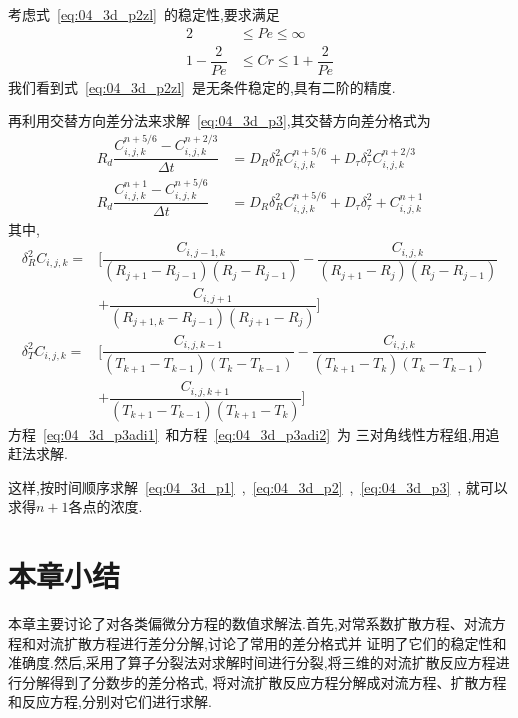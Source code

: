 考虑式~\eqref{eq:04_3d_p2zl}~的稳定性,要求满足
\begin{align}
2 & \leq Pe \leq \infty\\
1-\dfrac{2}{Pe}&\leq Cr\leq 1+\dfrac{2}{Pe}
\end{align}
我们看到式~\eqref{eq:04_3d_p2zl}~是无条件稳定的,具有二阶的精度.\par
再利用交替方向差分法来求解~\eqref{eq:04_3d_p3},其交替方向差分格式为
\begin{align}
R_d\dfrac{C_{i,j,k}^{n+5/6}-C_{i,j,k}^{n+2/3}}{\Delta t} &=
D_R\delta_R^2 C_{i,j,k}^{n+5/6}+D_{\tau}\delta^2_{\tau}C_{i,j,k}^{n+2/3} \label{eq:04_3d_p3adi1}\\
R_d\dfrac{C_{i,j,k}^{n+1}-C_{i,j,k}^{n+5/6}}{\Delta t}&=D_R\delta_R^2 C_{i,j,k}^{n+5/6}+D_{\tau}\delta_{\tau}^2+C_{i,j,k}^{n+1} \label{eq:04_3d_p3adi2} 
\end{align}
其中,
\begin{equation*}
\begin{split}
\delta_R^2 C_{i,j,k} =& [\dfrac{C_{i,j-1,k}}{(R_{j+1}-R_{j-1})(R_j-R_{j-1})}
-\dfrac{C_{i,j,k}}{(R_{j+1}-R_j)(R_j-R_{j-1})} \\
&+\dfrac{C_{i,j+1}}{(R_{j+1,k}-R_{j-1})(R_{j+1}-R_j)}] \\
\delta_T^2 C_{i,j,k} =& [\dfrac{C_{i,j,k-1}}{(T_{k+1}-T_{k-1})(T_k-T_{k-1})}-
\dfrac{C_{i,j,k}}{(T_{k+1}-T_k)(T_k-T_{k-1})} \\
&+\dfrac{C_{i,j,k+1}}{(T_{k+1}-T_{k-1})(T_{k+1}-T_k)}]
\end{split}
\end{equation*}
方程~\eqref{eq:04_3d_p3adi1}~和方程~\eqref{eq:04_3d_p3adi2}~为
三对角线性方程组,用追赶法求解.\par
这样,按时间顺序求解~\eqref{eq:04_3d_p1}~,~\eqref{eq:04_3d_p2}~,~\eqref{eq:04_3d_p3}~,
就可以求得$n+1$各点的浓度.
\section{本章小结}
本章主要讨论了对各类偏微分方程的数值求解法.首先,对常系数扩散方程、对流方程和对流扩散方程进行差分分解,讨论了常用的差分格式并
证明了它们的稳定性和准确度.然后,采用了算子分裂法对求解时间进行分裂,将三维的对流扩散反应方程进行分解得到了分数步的差分格式,
将对流扩散反应方程分解成对流方程、扩散方程和反应方程,分别对它们进行求解.
